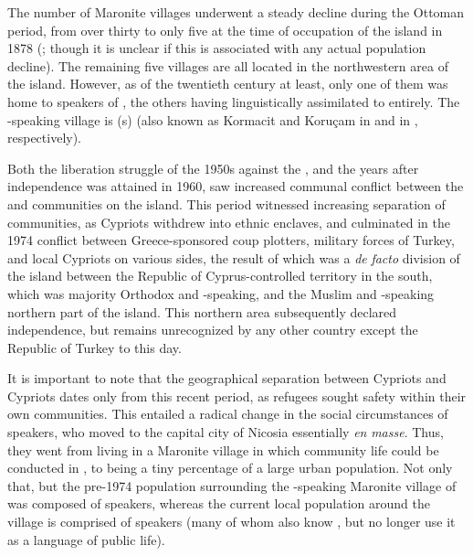 \documentclass[output=paper]{langsci/langscibook}
\begin{document}
The number of Maronite villages underwent a steady decline during the Ottoman period, from over thirty to only five at the time of  occupation of the island in 1878 (\citealt{BaiderKariolemou2015}; though it is unclear if this is associated with any actual population decline). The remaining five villages are all located in the northwestern area of the island. However, as of the twentieth century at least, only one of them was home to speakers of , the others having linguistically assimilated to   entirely. The -speaking village is (s) (also known as Kormacit and Koruçam in  and in , respectively).

Both the  liberation struggle of the 1950s against the , and the years after independence was attained in 1960, saw increased communal conflict between the  and  communities on the island. This period witnessed increasing separation of communities, as  Cypriots withdrew into ethnic enclaves, and  culminated in the 1974 conflict between Greece-sponsored coup plotters, military forces of Turkey, and local Cypriots on various sides, the result of which was a \textit{de} \textit{facto} division of the island between the Republic of Cyprus-controlled territory in the south, which was majority  Orthodox and -speaking, and the Muslim and -speaking northern part of the island. This northern area subsequently declared independence, but remains unrecognized by any other country except the Republic of Turkey to this day.

It is important to note that the  geographical separation between  Cypriots and  Cypriots dates only from this recent period, as refugees sought safety within their own communities. This entailed a radical change in the social circumstances of  speakers, who moved to the capital city of Nicosia essentially \textit{en} \textit{masse}. Thus, they went from living in a Maronite village in which community life could be conducted in , to being a tiny percentage of a large urban population. Not only that, but the pre-1974 population surrounding the -speaking Maronite village of  was composed of  speakers, whereas the current local population around the village is comprised of  speakers (many of whom also know , but no longer use it as a language of public life).
\end{document}

